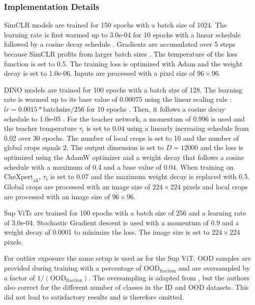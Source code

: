 \subsubsection{Implementation Details}
SimCLR models are trained for 150 epochs with a batch size of 1024.
The learning rate is first warmed up to 3.0e-04 for 10 epochs with a linear schedule \citep{Goyal2017} followed by a cosine decay schedule \citep{Chen2020,Loshchilov2016}. 
Gradients are accumulated over 5 steps because SimCLR profits from larger batch sizes \citep{Chen2020}.
The temperature of the loss function is set to 0.5. 
The training loss is optimized with Adam \citep{Kingma2014} and the weight decay is set to 1.0e-06.
Inputs are processed with a pixel size of $96\times96$.
\par
DINO models are trained for 100 epochs with a batch size of 128.
The learning rate is warmed up to its base value of $0.00075$ using the linear scaling rule \citep{Goyal2017}: $lr= 0.0015 * \text{batchsize}/256$ for 10 epochs \citep{Caron2021}.
Then, it follows a cosine decay schedule to 1.0e-05 \citep{Chen2020,Loshchilov2016}.
For the teacher network, a momentum of 0.996 is used and the teacher temperature $\tau_t$ is set to 0.04 using a linearly increasing schedule from 0.02 over 30 epochs.
The number of local crops is set to 10 and the number of global crops equals 2.
The output dimension is set to $D=12000$ and the loss is optimized using the AdamW optimizer \citep{Loshchilov2018} and a weight decay that follows a cosine schedule with a maximum of 0.4 and a base value of 0.04.
When training on $\text{CheXpert}_\text{all}$, $\tau_t$ is set to 0.07 and the maximum weight decay is replaced with 0.5.
Global crops are processed with an image size of $224\times224$ pixels and local crops are processed with an image size of $96\times96$.
\par
Sup ViTs are trained for 100 epochs with a batch size of 256 and a learning rate of 3.0e-04. 
Stochastic Gradient descent is used with a momentum of 0.9 and a weight decay of 0.0001 to minimize the loss.
The image size is set to $224\times224$ pixels.
\par
For outlier exposure the same setup is used as for the Sup ViT.
OOD samples are provided during training with a percentage of $\text{OOD}_\text{fraction}$ and are oversampled by a factor of $1/(\text{OOD}_\text{fraction})$.
The oversampling is adapted from \citep{Fort2021}, but the authors also correct for the different number of classes in the ID and OOD datasets.
This did not lead to satisfactory results and is therefore omitted.
